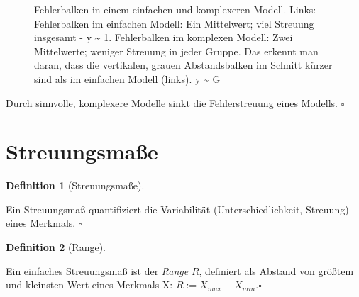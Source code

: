 \documentclass[
  letterpaper,
]{scrbook}
\theoremstyle{definition}
\theoremstyle{definition}
\theoremstyle{definition}
\newtheorem{definition}{Definition}[chapter]
\theoremstyle{remark}
\begin{document}
\begin{figure}
\begin{minipage}{0.50\linewidth}
{}


\end{minipage}%

\caption{\label{fig-fehler-red}Fehlerbalken in einem einfachen und
komplexeren Modell. Links: Fehlerbalken im einfachen Modell: Ein
Mittelwert; viel Streuung insgesamt - y \textasciitilde{} 1.
Fehlerbalken im komplexen Modell: Zwei Mittelwerte; weniger Streuung in
jeder Gruppe. Das erkennt man daran, dass die vertikalen, grauen
Abstandsbalken im Schnitt kürzer sind als im einfachen Modell (links). y
\textasciitilde{} G}

\end{figure}%

\begin{tcolorbox}[enhanced jigsaw, colbacktitle=quarto-callout-important-color!10!white, toptitle=1mm, colframe=quarto-callout-important-color-frame, breakable, toprule=.15mm, bottomrule=.15mm, bottomtitle=1mm, left=2mm, opacitybacktitle=0.6, colback=white, arc=.35mm, coltitle=black, title=\textcolor{quarto-callout-important-color}{\faExclamation}\hspace{0.5em}{Wichtig}, opacityback=0, rightrule=.15mm, leftrule=.75mm, titlerule=0mm]

Durch sinnvolle, komplexere Modelle sinkt die Fehlerstreuung eines
Modells. \(\square\)

\end{tcolorbox}

\section{Streuungsmaße}\label{sec-streuung}

\begin{definition}[Streuungsmaße]\protect\hypertarget{def-streuungsmaße}{}\label{def-streuungsmaße}

Ein Streuungsmaß quantifiziert die Variabilität (Unterschiedlichkeit,
Streuung) eines Merkmals. \(\square\)

\end{definition}

\begin{definition}[Range]\protect\hypertarget{def-range}{}\label{def-range}

Ein einfaches Streuungsmaß ist der \emph{Range} \(R\), definiert als
Abstand von größtem und kleinsten Wert eines Merkmals X:
\(R := X_{max} - X_{min}. \square\)

\end{definition}
\end{document}
